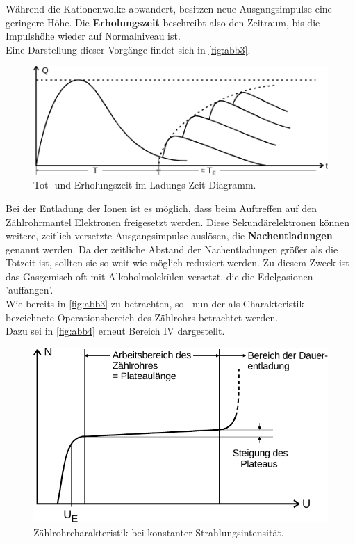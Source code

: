 Während die Kationenwolke abwandert, 
besitzen neue Ausgangsimpulse eine 
geringere Höhe.
Die \textbf{Erholungszeit} beschreibt also
den Zeitraum, bis die Impulshöhe wieder auf
Normalniveau ist.\\

Eine Darstellung dieser Vorgänge findet sich in
\autoref{fig:abb3}.

\begin{figure}[H]
    \centering
    \includegraphics{figures/Abb_3.pdf}
    \caption{Tot- und Erholungszeit im Ladungs-Zeit-Diagramm\cite{ap03}.}
    \label{fig:abb3}
\end{figure}

Bei der Entladung der Ionen ist es möglich,
dass beim Auftreffen auf den Zählrohrmantel
Elektronen freigesetzt werden.
Diese Sekundärelektronen können weitere,
zeitlich versetzte Ausgangsimpulse auslösen,
die \textbf{Nachentladungen} genannt werden.
Da der zeitliche Abstand der Nachentladungen
größer als die Totzeit ist, sollten sie so weit
wie möglich reduziert werden.
Zu diesem Zweck ist das Gasgemisch oft mit
Alkoholmolekülen versetzt, die die Edelgasionen
'auffangen'. \\

Wie bereits in \autoref{fig:abb3} zu betrachten,
soll nun der als Charakteristik bezeichnete
Operationsbereich des Zählrohrs betrachtet werden. \\

Dazu sei in \autoref{fig:abb4} erneut Bereich IV dargestellt.

\begin{figure}[H]
    \centering
    \includegraphics{figures/Abb_4.pdf}
    \caption{Zählrohrcharakteristik bei konstanter Strahlungsintensität\cite{ap03}.}
    \label{fig:abb4}
\end{figure}

